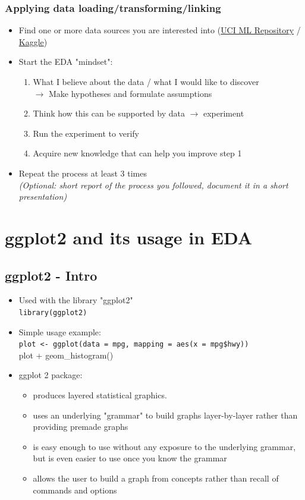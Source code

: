 \documentclass[a4paper]{article}
\begin{document}
			\subsubsection{Applying data loading/transforming/linking}
			
			\begin{itemize}
				\item Find one or more data sources you are interested into (\href{https://archive.ics.uci.edu/ml/datasets.php}{UCI ML Repository} / \href{https://www.kaggle.com/datasets}{Kaggle})
				\item Start the EDA "mindset":
					\begin{enumerate}
						\item What I believe about the data / what I would like to discover \\
							$\rightarrow$ Make hypotheses and formulate assumptions
						\item Think how this can be supported by data $\rightarrow$ experiment
						\item Run the experiment to verify
						\item Acquire new knowledge that can help you improve step 1
					\end{enumerate}
				\item Repeat the process at least 3 times \\
				\textit{(Optional: short report of the process you followed, document it in a short presentation)}
			\end{itemize}
		
	\section{ggplot2 and its usage in EDA}
	
		\subsection{ggplot2 - Intro}
		
		\begin{itemize}
			\item Used with the library "ggplot2" \\
				\texttt{library(ggplot2)}
			\item Simple usage example: \\
				\texttt{plot <- ggplot(data = mpg, mapping = aes(x = mpg\$hwy))} \\
				plot + geom\_histogram()
			\item ggplot 2 package:
				\begin{itemize}
					\item produces layered statistical graphics.
					\item uses an underlying "grammar" to build graphs layer-by-layer rather than providing premade graphs
					\item is easy enough to use without any exposure to the underlying grammar, but is even easier to use once you know the grammar
					\item allows the user to build a graph from concepts rather than recall of commands and options
				\end{itemize}
		\end{itemize}
	
\end{document}

